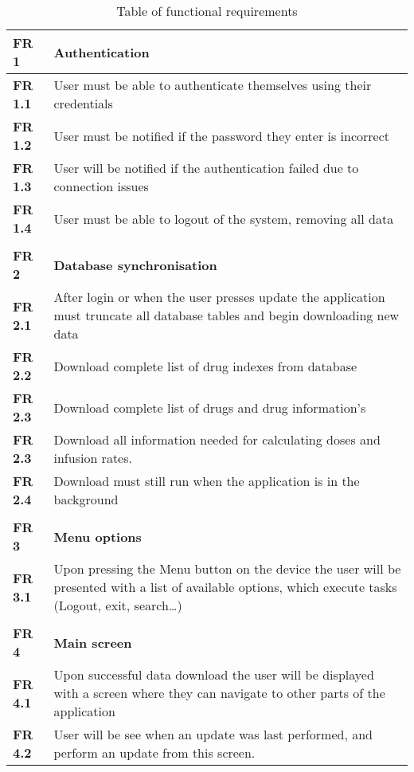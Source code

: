 \begin{center}
\begin{longtable}{| l | p{13cm} |}
\caption{Table of functional requirements}\tabularnewline
\hline
\textbf{FR 1}   & \textbf{Authentication}   \\ \hline
\textbf{FR 1.1} & User must be able to authenticate themselves using their credentials   \\ \hline
\textbf{FR 1.2} & User must be notified if the password they enter is incorrect\\ \hline
\textbf{FR 1.3} & User will be notified if the authentication failed due to connection issues \\ \hline
\textbf{FR 1.4} & User must be able to logout of the system, removing all data \\ \hline
\textbf{}  &  \\ \hline
\textbf{FR 2}   & \textbf{Database synchronisation}   \\ \hline
\textbf{FR 2.1} & After login or when the user presses update the application must truncate all database tables and begin downloading new data  \\ \hline
\textbf{FR 2.2} & Download complete list of drug indexes from database    \\ \hline
\textbf{FR 2.3} & Download complete list of drugs and drug information’s  \\ \hline
\textbf{FR 2.3} & Download all information needed for calculating doses and infusion rates.   \\ \hline
\textbf{FR 2.4} & Download must still run when the application is in the background \\ \hline
\textbf{}  &  \\ \hline
\textbf{FR 3}   & \textbf{Menu options}\\ \hline
\textbf{FR 3.1} & Upon pressing the Menu button on the device the user will be presented with a list of available options, which execute tasks (Logout, exit, search…)   \\ \hline
\textbf{}  &  \\ \hline
\textbf{FR 4}   & \textbf{Main screen} \\ \hline
\textbf{FR 4.1} & Upon successful data download the user will be displayed with a screen where they can navigate to other parts of the application   \\ \hline
\textbf{FR 4.2} & User will be see when an update was last performed, and perform an update from this screen.\\ \hline

\end{longtable}
\end{center}
